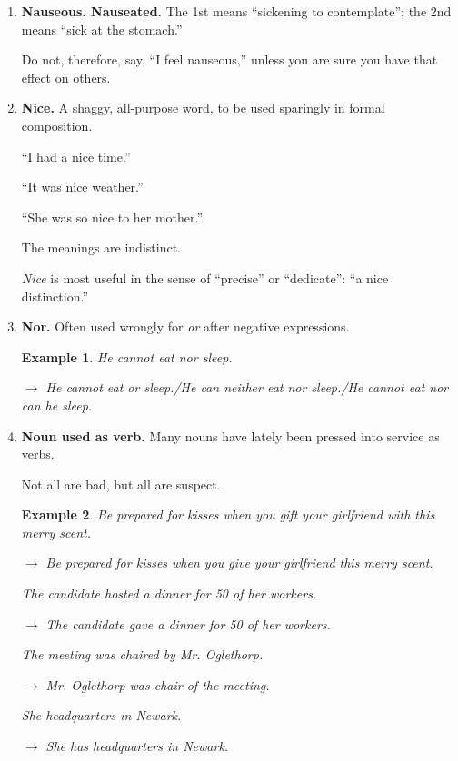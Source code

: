 \documentclass{book}
\numberwithin{equation}{section}
\newtheorem{example}{Example}[chapter]
\begin{document}
\begin{enumerate}
    Unless more specific statements follow, the reader cannot tell whether the poems have to do with natural scenery, rural life, the sunset, the untracked wilderness, or the habits of squirrels.
    \item \textbf{Nauseous. Nauseated.} The 1st means ``sickening to contemplate''; the 2nd means ``sick at the stomach.''
    
    Do not, therefore, say, ``I feel nauseous,'' unless you are sure you have that effect on others.
    \item \textbf{Nice.} A shaggy, all-purpose word, to be used sparingly in formal composition.
    
    ``I had a nice time.''
    
    ``It was nice weather.''
    
    ``She was so nice to her mother.''
    
    The meanings are indistinct.
    
    \textit{Nice} is most useful in the sense of ``precise'' or ``dedicate'': ``a nice distinction.''
    \item \textbf{Nor.} Often used wrongly for \textit{or} after negative expressions.
    \begin{example}
        He cannot eat nor sleep.
        
        $\to$ He cannot eat or sleep./He can neither eat nor sleep./He cannot eat nor can he sleep.
    \end{example}
    \item \textbf{Noun used as verb.} Many nouns have lately been pressed into service as verbs.
    
    Not all are bad, but all are suspect.
    \begin{example}
        Be prepared for kisses when you gift your girlfriend with this merry scent.
        
        $\to$ Be prepared for kisses when you give your girlfriend this merry scent.
        
        The candidate hosted a dinner for 50 of her workers.
        
        $\to$ The candidate gave a dinner for 50 of her workers.
        
        The meeting was chaired by Mr. Oglethorp.
        
        $\to$ Mr. Oglethorp was chair of the meeting.
        
        She headquarters in Newark.
        
        $\to$ She has headquarters in Newark.
        

\end{example}
\end{enumerate}
\end{document}
